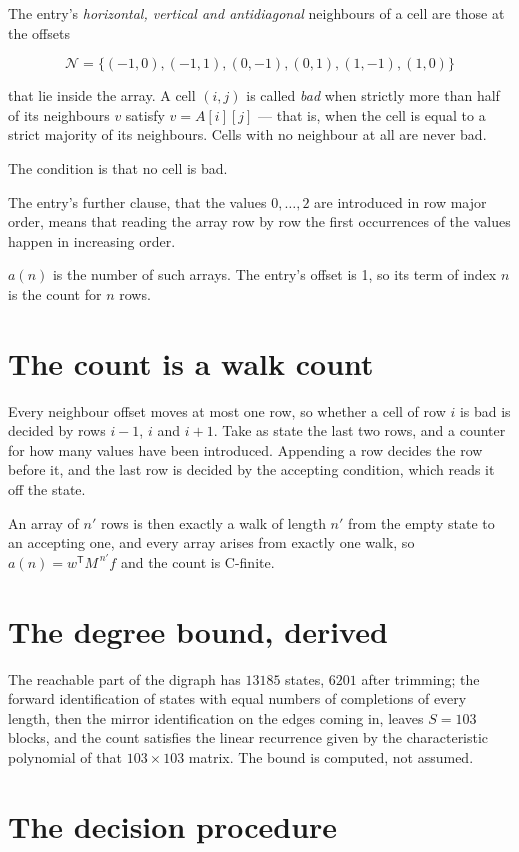 \documentclass[11pt]{article}
\theoremstyle{definition}
\begin{document}
The entry's {\itshape horizontal, vertical and antidiagonal} neighbours of a cell are those at the offsets

\[\mathcal{N} = \{(-1,0), (-1,1), (0,-1), (0,1), (1,-1), (1,0)\}\]

that lie inside the array. A cell $(i,j)$ is called {\itshape bad} when strictly more than half of its neighbours $v$ satisfy $v = A[i][j]$ --- that is, when the cell is equal to a strict majority of its neighbours. Cells with no neighbour at all are never bad.

The condition is that no cell is bad.

The entry's further clause, that the values $0,\dots,2$ are introduced in row major order, means that reading the array row by row the first occurrences of the values happen in increasing order.

$a(n)$ is the number of such arrays. The entry's offset is 1, so its term of index $n$ is the count for $n$ rows.

\section{The count is a walk count}

Every neighbour offset moves at most one row, so whether a cell of row $i$ is bad is decided by rows $i-1$, $i$ and $i+1$. Take as state the last two rows, and a counter for how many values have been introduced. Appending a row decides the row before it, and the last row is decided by the accepting condition, which reads it off the state.

An array of $n'$ rows is then exactly a walk of length $n'$ from the empty state to an accepting one, and every array arises from exactly one walk, so $a(n) = w^{\mathsf T}M^{\,n'}f$ and the count is C-finite.

\section{The degree bound, derived}

The reachable part of the digraph has $13185$ states, $6201$ after trimming; the forward identification of states with equal numbers of completions of every length, then the mirror identification on the edges coming in, leaves $S = 103$ blocks, and the count satisfies the linear recurrence given by the characteristic polynomial of that $103\times103$ matrix. The bound is computed, not assumed.

\section{The decision procedure}
\end{document}
